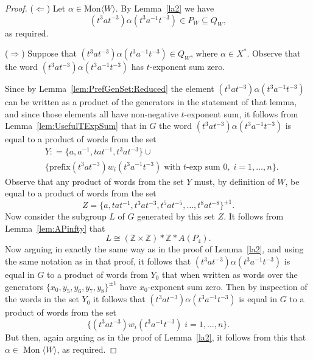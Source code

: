 \documentclass[10pt,a4paper]{amsart}
\newcommand{\Mgen}[1]{\operatorname{Mon}\bigl\langle #1 \bigr\rangle}
\newcommand{\Z}{\mathbb{Z}}
\begin{document}
\begin{proof}
($\Longleftarrow$)  Let $\alpha \in \mathrm{Mon}\langle W \rangle$. By Lemma~\ref{la2} we have   
\[
(t^3at^{-3})\alpha (t^3a^{-1}t^{-3}) \in  P_W \subseteq Q_{W},  
\]
as required. 
    
($\Longrightarrow$)  Suppose that $(t^3at^{-3})\alpha (t^3a^{-1}t^{-3}) \in Q_{W}$, where $\alpha \in X^*$.  Observe that the word $(t^3at^{-3})\alpha (t^3a^{-1}t^{-3})$ has $t$-exponent sum zero. 

Since  by Lemma~\ref{lem:PrefGenSet:Reduced} the element $(t^3at^{-3})\alpha (t^3a^{-1}t^{-3})$ can be written as a product of the generators in the statement of that lemma, and since those elements all have non-negative $t$-exponent sum, it follows from  Lemma~\ref{lem:UsefulTExpSum}  that in $G$ the word $(t^3at^{-3})\alpha (t^3a^{-1}t^{-3})$ is equal to a product of words from the set   
\begin{align*}
        & Y : = \{ a, a^{-1}, tat^{-1}, t^3at^{-3} \} \cup \\ 
& \{ \text{prefix}(t^3at^{-3})w_i(t^3a^{-1}t^{-3}) \; \mbox{with $t$-exp sum $0$}, \; i=1, \ldots, n \}. 
    \end{align*}
Observe that any product of words from the set $Y$ must, by definition of $W$, be equal to a product of words from the set    
\[
Z =  \{a, tat^{-1}, t^3at^{-3}, t^5at^{-5}, \dots, t^8at^{-8}\}^{\pm 1}.
\]
Now consider the subgroup $L$ of $G$ generated by this set $Z$. It follows from Lemma~\ref{lem:APinfty} that  
\[
L \cong (\Z \times \Z) \ast \Z \ast A(P_4).
\]
Now arguing in exactly the same way as in the proof of Lemma~\ref{la2}, and using the same notation as in that proof, it follows that   $(t^3at^{-3})\alpha (t^3a^{-1}t^{-3})$ is equal in $G$ to a product of words from $Y_0$ that when written as words over the generators $\{ x_0, y_5, y_6, y_7, y_8 \}^{\pm 1}$ have $x_0$-exponent sum zero. Then by inspection of the words in the set $Y_0$ it follows that $(t^3at^{-3})\alpha (t^3a^{-1}t^{-3})$ is equal in $G$ to a product of words from the set    
\[
\{ (t^3at^{-3})w_i(t^3a^{-1}t^{-3}) \; i=1, \ldots, n \}.
\]
But then, again arguing as in the proof of Lemma~\ref{la2}, it follows from this that  
$\alpha \in \Mgen{W}$, as required.  
\end{proof}
\end{document}
